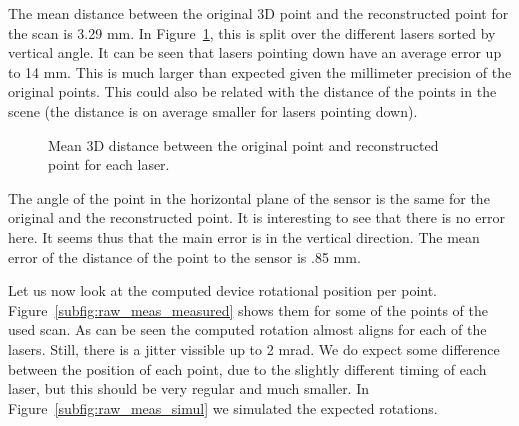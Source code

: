 \documentclass[english]{article}
\begin{document}
The mean distance between the original 3D point and the reconstructed point for
the scan is 3.29 mm. In Figure~\ref{fig:norms_error}, this is split over the
different lasers sorted by vertical angle. It can be seen that lasers pointing
down have an average error up to 14 mm. This is much larger than expected given
the millimeter precision of the original points. This could also be related with
the distance of the points in the scene (the distance is on average smaller for
lasers pointing down).

\begin{figure}
    \centering
    \def\svgwidth{\columnwidth}
    \scalebox{0.9}{
    \def\svgwidth{.6 \columnwidth}
      
    }
    \caption{Mean 3D distance between the original point and reconstructed point
    for each laser.}
		\label{fig:norms_error}
\end{figure}

The angle of the point in the horizontal plane of the sensor is the same for the
original and the reconstructed point. It is interesting to see that there is no
error here. It seems thus that the main error is in the vertical direction.  The
mean error of the distance of the point to the sensor is .85 mm.

Let us now look at the computed device rotational position per point.
Figure~\ref{subfig:raw_meas_measured} shows them for some of the points of the
used scan. As can be seen the computed rotation almost aligns for each of the
lasers. Still, there is a jitter vissible up to 2 mrad. We do expect some
difference between the position of each point, due to the slightly different
timing of each laser, but this should be very regular and much smaller. In
Figure~\ref{subfig:raw_meas_simul} we simulated the expected rotations.

%      
\end{document}
